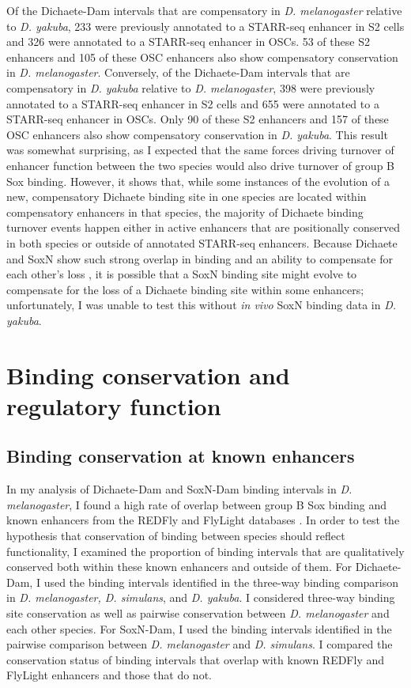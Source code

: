 Of the Dichaete-Dam intervals that are compensatory in \emph{D. melanogaster} relative to \emph{D. yakuba}, 233 were previously annotated to a STARR-seq enhancer in S2 cells and 326 were annotated to a STARR-seq enhancer in OSCs. 53 of these S2 enhancers and 105 of these OSC enhancers also show compensatory conservation in \emph{D. melanogaster}. Conversely, of the Dichaete-Dam intervals that are compensatory in \emph{D. yakuba} relative to \emph{D. melanogaster}, 398 were previously annotated to a STARR-seq enhancer in S2 cells and 655 were annotated to a STARR-seq enhancer in OSCs. Only 90 of these S2 enhancers and 157 of these OSC enhancers also show compensatory conservation in \emph{D. yakuba}. This result was somewhat surprising, as I expected that the same forces driving turnover of enhancer function between the two species would also drive turnover of group B Sox binding. However, it shows that, while some instances of the evolution of a new, compensatory Dichaete binding site in one species are located within compensatory enhancers in that species, the majority of Dichaete binding turnover events happen either in active enhancers that are positionally conserved in both species or outside of annotated STARR-seq enhancers. Because Dichaete and SoxN show such strong overlap in binding and an ability to compensate for each other’s loss \citep{ferrero_soxneuro_2014}, it is possible that a SoxN binding site might evolve to compensate for the loss of a Dichaete binding site within some enhancers; unfortunately, I was unable to test this without \emph{in vivo} SoxN binding data in \emph{D. yakuba}.
 
\section{Binding conservation and regulatory function}
\subsection{Binding conservation at known enhancers}
In my analysis of Dichaete-Dam and SoxN-Dam binding intervals in \emph{D. melanogaster}, I found a high rate of overlap between group B Sox binding and known enhancers from the REDFly and FlyLight databases \citep{gallo_redfly_2010,manning_resource_2012}. In order to test the hypothesis that conservation of binding between species should reflect functionality, I examined the proportion of binding intervals that are qualitatively conserved both within these known enhancers and outside of them. For Dichaete-Dam, I used the binding intervals identified in the three-way binding comparison in \emph{D. melanogaster, D. simulans}, and \emph{D. yakuba}. I considered three-way binding site conservation as well as pairwise conservation between \emph{D. melanogaster} and each other species. For SoxN-Dam, I used the binding intervals identified in the pairwise comparison between \emph{D. melanogaster} and \emph{D. simulans}. I compared the conservation status of binding intervals that overlap with known REDFly and FlyLight enhancers and those that do not.

